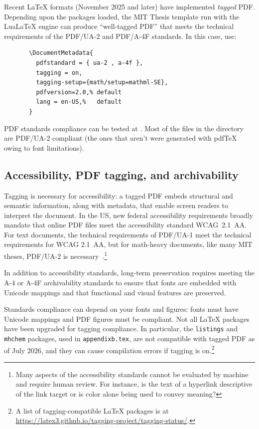 \documentclass[11pt]{article}
\newcommand*\pdfTeX{pdf\TeX}
\newcommand*\LuaLaTeX{Lua\LaTeX}
\begin{document}
Recent \LaTeX{} formats (November 2025 and later) have implemented \emph{tagged} PDF. Depending upon the packages loaded, the MIT Thesis template run with the \LuaLaTeX{} engine can produce ``well-tagged PDF'' that meets the technical requirements of the PDF/UA-2 and PDF/A-4F standards.  In this case, use: 
\begin{verbatim}
       \DocumentMetadata{
         pdfstandard = { ua-2 , a-4f }, 
         tagging = on,
         tagging-setup={math/setup=mathml-SE},
         pdfversion=2.0,% default
         lang = en-US,%   default
       } 
\end{verbatim}

PDF standards compliance can be tested at . Most of the files in the  directory are PDF/UA-2 compliant (the ones that aren't were generated with \pdfTeX{} owing to font limitations).

\subsection{Accessibility, PDF tagging, and archivability}
Tagging is necessary for accessibility: a tagged {PDF} embeds structural and semantic information, along with metadata, that enable screen readers to interpret the document. In the US, new federal accessibility requirements broadly mandate that online PDF files meet the accessibility standard WCAG~2.1~AA.  For text documents, the technical requirements of PDF/UA-1 meet the technical requirements for WCAG 2.1~AA, but for math-heavy documents, like many MIT theses, PDF/UA-2 is necessary~\cite{lienhard2026}.\footnote{Many aspects of the accessibility standards cannot be evaluated by machine and require human review. For instance, is the text of a hyperlink descriptive of the link target or is color alone being used to convey meaning?}

In addition to accessibility standards, long-term preservation requires meeting the A-4 or A-4F archivability standards to ensure that fonts are embedded with Unicode mappings and that functional and visual features are preserved. 

Standards compliance can depend on your fonts and figures: fonts must have Unicode mappings and PDF figures must be compliant. Not all \LaTeX{} packages have been upgraded for tagging compliance. In particular, the \texttt{listings} and \texttt{mhchem} packages, used in \texttt{appendixb.tex}, are not compatible with tagged PDF as of July 2026, and they can cause compilation errors if tagging is on.\footnote{A list of tagging-compatible \LaTeX{} packages is at \url{https://latex3.github.io/tagging-project/tagging-status/}.}
\end{document}
